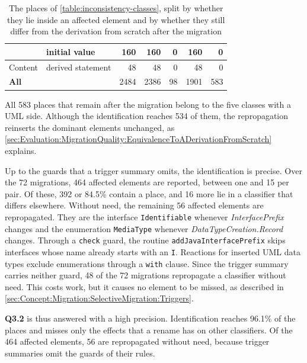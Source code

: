 \begin{table}
\begin{tabularx}{0.95\textheight}{|l|>{\raggedright\arraybackslash}X|r|r|r|r|r|}
        \hline
                      & initial value                                & 160             & 160              & 0                    & 160               & 0                  \\
        \hline
        Content       & derived statement                            & 48              & 48               & 0                    & 48                & 0                  \\
        \hline
        \textbf{All}  &                                              & 2484            & 2386             & 98                   & 1901              & 583                \\
        \hline
    \end{tabularx}
    \caption{The places of \autoref{table:inconsistency-classes}, split by whether they lie inside an affected element and by whether they still differ from the derivation from scratch after the migration}
    \label{table:selection-coverage}
\end{table}

All 583 places that remain after the migration belong to the five classes with a UML side.
Although the identification reaches 534 of them, the repropagation reinserts the dominant elements unchanged, as \autoref{sec:Evaluation:MigrationQuality:EquivalenceToADerivationFromScratch} explains.

Up to the guards that a trigger summary omits, the identification is precise.
Over the 72 migrations, 464 affected elements are reported, between one and 15 per pair.
Of these, 392 or 84.5\% contain a place, and 16 more lie in a classifier that differs elsewhere.
Without need, the remaining 56 affected elements are repropagated.
They are the interface \texttt{Identifiable} whenever \textit{InterfacePrefix} changes and the enumeration \texttt{MediaType} whenever \textit{DataTypeCreation.Record} changes.
Through a \texttt{check} guard, the routine \texttt{addJavaInterfacePrefix} skips interfaces whose name already starts with an \texttt{I}.
Reactions for inserted UML data types exclude enumerations through a \texttt{with} clause.
Since the trigger summary carries neither guard, 48 of the 72 migrations repropagate a classifier without need.
This costs work, but it causes no element to be missed, as described in \autoref{sec:Concept:Migration:SelectiveMigration:Triggers}.

\textbf{Q3.2} is thus answered with a high precision.
Identification reaches 96.1\% of the places and misses only the effects that a rename has on other classifiers.
Of the 464 affected elements, 56 are repropagated without need, because trigger summaries omit the guards of their rules.

